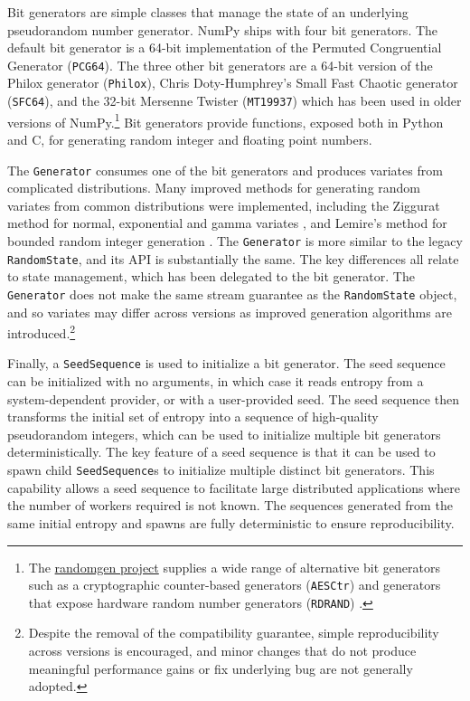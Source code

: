 \documentclass[twocolumn]{article}
\begin{document}
Bit generators are simple classes that manage the state of an underlying
pseudorandom number generator. NumPy ships with four bit generators. The default
bit generator is a 64-bit implementation of the Permuted Congruential Generator
\cite{pcg64} (\texttt{PCG64}). The three other bit generators are a 64-bit version
of the Philox generator \cite{random123} (\texttt{Philox}), Chris Doty-Humphrey's
Small Fast Chaotic generator \cite{practrand} (\texttt{SFC64}), and the 32-bit
Mersenne Twister \cite{mt19937} (\texttt{MT19937}) which has been used in older
versions of NumPy.\footnote{The
\href{https://github.com/bashtage/randomgen}{randomgen project} supplies a wide
range of alternative bit generators such as a cryptographic counter-based
generators (\texttt{AESCtr}) and generators that expose hardware random number
generators (\texttt{RDRAND}) \cite{randomgen}.} Bit generators provide
functions, exposed both in Python and C, for generating random integer
and floating point numbers.

The \texttt{Generator} consumes one of the bit generators and produces variates
from complicated distributions. Many improved methods for generating random
variates from common distributions were implemented, including the Ziggurat
method for normal, exponential and gamma variates \cite{ziggurat}, and Lemire's
method for bounded random integer generation \cite{lemire}. The \texttt{Generator}
is more similar to the legacy \texttt{RandomState}, and its API is substantially
the same. The key differences all relate to state management, which has been
delegated to the bit generator. The \texttt{Generator} does not make the same
stream guarantee as the \texttt{RandomState} object, and so variates may differ
across versions as improved generation algorithms are
introduced.\footnote{Despite the removal of the compatibility guarantee, simple
reproducibility across versions is encouraged, and minor changes that do not
produce meaningful performance gains or fix underlying bug are not generally
adopted.}

Finally, a \texttt{SeedSequence} is used to initialize a bit generator. The seed
sequence can be initialized with no arguments, in which case it reads entropy
from a system-dependent provider, or with a user-provided seed. The seed
sequence then transforms the initial set of entropy into a sequence of
high-quality pseudorandom integers, which can be used to initialize multiple bit
generators deterministically. The key feature of a seed sequence is that
it can be used to spawn child \texttt{SeedSequence}s to initialize
multiple distinct bit generators.
This capability allows a seed sequence to facilitate large distributed applications
where the number of workers required is not known. The sequences generated from
the same initial entropy and spawns are fully deterministic to ensure
reproducibility.
\end{document}
